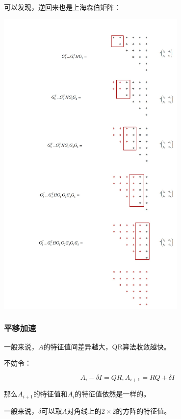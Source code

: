 \documentclass[10pt]{beamer}
\begin{document}
	\begin{frame}
		\frametitle{}
	
		可以发现，逆回来也是上海森伯矩阵：

		\includegraphics[width=0.7\textwidth]{7.jpg}

	\end{frame}
	\begin{frame}
		\frametitle{平移加速}
	
		一般来说，$A$的特征值间差异越大，QR算法收敛越快。

		不妨令：

		$$
		A_i-\delta I=QR,A_{i+1}=RQ+\delta I
		$$

		那么$A_{i+1}$的特征值和$A_i$的特征值依然是一样的。

		一般来说，$\delta$可以取$A$对角线上的$2\times 2$的方阵的特征值。
	
	\end{frame}
\end{document}

